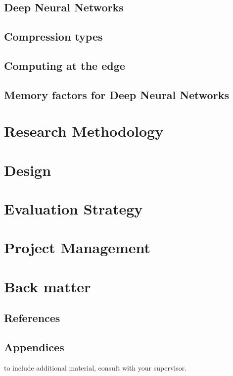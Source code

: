 \documentclass[11pt]{article}
\begin{document}
\subsection{Deep Neural Networks}\label{subsec:deepLearning}


\subsection{Compression types}\label{subsec:compressionTypes}


\subsection{Computing at the edge}\label{subsec:edgeComputing}


\subsection{Memory factors for Deep Neural Networks}\label{subsec:hardwareArch}


\pagebreak
\section{Research Methodology}


\pagebreak
\section{Design}


\pagebreak
\section{Evaluation Strategy}


\pagebreak
\section{Project Management}


\pagebreak
\appendix
\section{Back matter}
\subsection{References}
\printbibliography

\subsection{Appendices}
to include additional material, consult with your supervisor.

\printnoidxglossary[type=acronym]
\printacronyms
\end{document}
